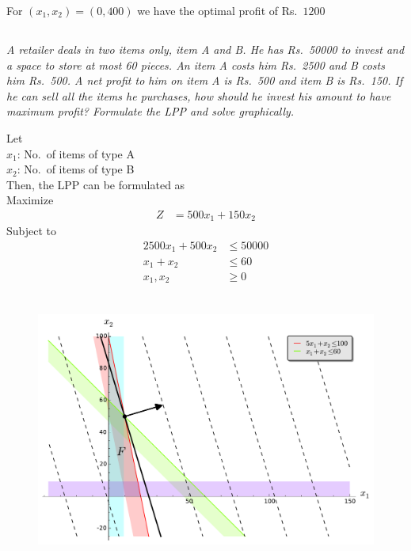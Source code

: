 \documentclass[12pt]{article}
\begin{document}
For $\left(x_1,x_2\right) = \left(0, 400\right)$ we have the optimal profit of Rs.~$1200$

\subsection{}
\emph{A retailer deals in two items only, item A and B. He has Rs.~50000 to invest and a space to store at most 60 pieces. An item A
costs him Rs.~2500 and B costs him Rs.~500. A net profit to him on item A is Rs.~500 and item B is Rs.~150. If he can sell all the items he 
purchases, how should he invest his amount to have maximum profit? Formulate the LPP and solve graphically.}

\noindent
Let\\
$x_1$: No.~of items of type A\\
$x_2$: No.~of items of type B\\

Then, the LPP can be formulated as\\
Maximize
\begin{align*}
  Z &= 500 x_1 + 150 x_2
\end{align*}
Subject to
\begin{align*}
  2500 x_1 + 500 x_2 &\le 50000 \tag{Max amount the person can invest}\\
  x_1+x_2 &\le 60 \tag{Space to store 60 pieces}\\
  x_1,x_2 &\ge 0
\end{align*}

\begin{figure}[H]
\centering
\includegraphics[height=3.5in]{./images/p7_2.pdf}
\end{figure}
\end{document}
